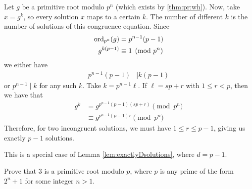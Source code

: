 \documentclass{subfile}
\begin{document}
	\begin{solution}[1]
		Let $g$ be a primitive root modulo $p^n$ (which exists by \autoref{thm:pr:wh}). Now, take $x=g^k$, so every solution $x$ maps to a certain $k$. The number of different $k$ is the number of solutions of this congruence equation. Since
			\begin{align*}
				\operatorname{ord}_{p^n}(g)
					& =p^{n-1}(p-1)\\
				g^{k(p-1)}
					& \equiv1\pmod{p^n}
			\end{align*}
		we either have
			\begin{align*}
				p^{n-1}(p-1)
					& \mid k(p-1)
			\end{align*}
		or $p^{n-1} \mid k$ for any such $k$. Take $k=p^{n-1}\ell$. If $\ell=sp+r$ with $1\leq r<p$, then we have that
			\begin{align*}
				g^k
					& =g^{p^{n-1}(p-1)(sp+r)}\pmod{p^{n}}\\
					& \equiv g^{p^{n-1}(p-1)r}\pmod{p^n}
			\end{align*}
		Therefore, for two incongruent solutions, we must have $1\leq r\leq p-1$, giving us exactly $p-1$ solutions.
	\end{solution}

	\begin{solution}[2]
		This is a special case of Lemma \ref{lem:exactlyDsolutions}, where $d=p-1$.
	\end{solution}

	\begin{problem}
		Prove that $3$ is a primitive root modulo $p$, where $p$ is any prime of the form $2^n+1$ for some integer $n>1$.
	\end{problem}
\end{document}
